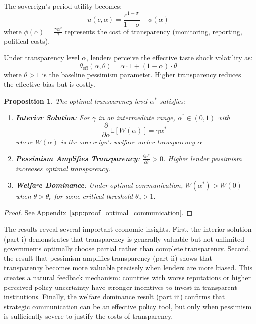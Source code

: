 \documentclass[12pt]{article}
\theoremstyle{plain}
\newtheorem{proposition}{Proposition}
\begin{document}
The sovereign's period utility becomes:
\begin{equation}
	u(c,\alpha) = \frac{c^{1-\sigma}}{1-\sigma} - \phi(\alpha) \label{eq:utility_communication}
\end{equation}
where $\phi(\alpha) = \frac{\gamma \alpha^2}{2}$ represents the cost of transparency (monitoring, reporting, political costs).

Under transparency level $\alpha$, lenders perceive the effective taste shock
volatility as:
\begin{equation}
	\theta_{\text{eff}}(\alpha, \theta) = \alpha \cdot 1 + (1-\alpha) \cdot \theta \label{eq:effective_theta}
\end{equation}
where $\theta > 1$ is the baseline pessimism parameter. Higher transparency reduces the effective bias but is costly.

\begin{proposition}\label{prop:optimal_communication}
	The optimal transparency level $\alpha^*$ satisfies:
	\begin{enumerate}
		\item[\textbf{(i)}] \textbf{Interior Solution}: For $\gamma$ in an intermediate range, $\alpha^* \in (0,1)$ with
		      \begin{equation}
			      \frac{\partial}{\partial \alpha} \mathbb{E}[W(\alpha)] = \gamma \alpha^* \label{eq:foc_transparency}
		      \end{equation}
		      where $W(\alpha)$ is the sovereign's welfare under transparency $\alpha$.
		\item[\textbf{(ii)}] \textbf{Pessimism Amplifies Transparency}: $\frac{\partial \alpha^*}{\partial \theta} > 0$. Higher lender pessimism increases optimal transparency.
		\item[\textbf{(iii)}] \textbf{Welfare Dominance}: Under optimal communication, $W(\alpha^*) > W(0)$ when $\theta > \theta_c$ for some critical threshold $\theta_c > 1$.
	\end{enumerate}
\end{proposition}

\begin{proof}
	See Appendix~\ref{app:proof_optimal_communication}.
\end{proof}

The results reveal several important economic insights. First, the interior
solution (part i) demonstrates that transparency is generally valuable but not
unlimited---governments optimally choose partial rather than complete
transparency. Second, the result that pessimism amplifies transparency (part
ii) shows that transparency becomes more valuable precisely when lenders are
more biased. This creates a natural feedback mechanism: countries with worse
reputations or higher perceived policy uncertainty have stronger incentives to
invest in transparent institutions. Finally, the welfare dominance result (part
iii) confirms that strategic communication can be an effective policy tool, but
only when pessimism is sufficiently severe to justify the costs of
transparency.
\end{document}
